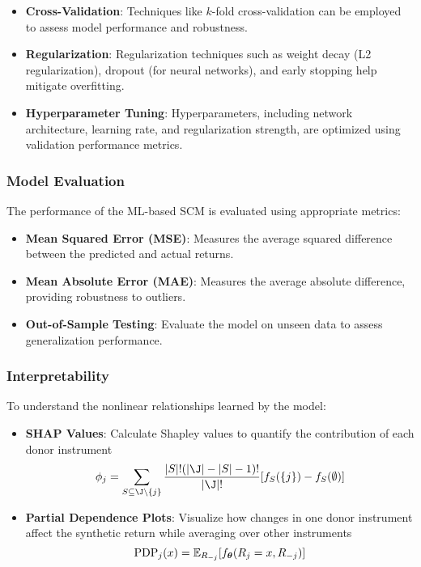 \begin{itemize}
    \item \textbf{Cross-Validation}: Techniques like $k$-fold cross-validation can be employed to assess model performance and robustness.

    \item \textbf{Regularization}: Regularization techniques such as weight decay (L2 regularization), dropout (for neural networks), and early stopping help mitigate overfitting.

    \item \textbf{Hyperparameter Tuning}: Hyperparameters, including network architecture, learning rate, and regularization strength, are optimized using validation performance metrics.

\end{itemize}

\subsubsection{Model Evaluation}

The performance of the ML-based SCM is evaluated using appropriate metrics:

\begin{itemize}
    \item \textbf{Mean Squared Error (MSE)}: Measures the average squared difference between the predicted and actual returns.

    \item \textbf{Mean Absolute Error (MAE)}: Measures the average absolute difference, providing robustness to outliers.

    \item \textbf{Out-of-Sample Testing}: Evaluate the model on unseen data to assess generalization performance.

\end{itemize}

\subsubsection{Interpretability}
To understand the nonlinear relationships learned by the model:

\begin{itemize}
   \item \textbf{SHAP Values}: Calculate Shapley values to quantify the contribution of each donor instrument
   $$\phi_j = \sum_{S\subseteq \J\setminus\{j\}} \frac{|S|!(|\J|-|S|-1)!}{|\J|!}[f_S(\{j\}) - f_S(\emptyset)]$$
   
   \item \textbf{Partial Dependence Plots}: Visualize how changes in one donor instrument affect the synthetic return while averaging over other instruments
   $$\text{PDP}_j(x) = \mathbb{E}_{R_{-j}}[f_{\boldsymbol \theta}(R_j=x,R_{-j})]$$
\end{itemize}

